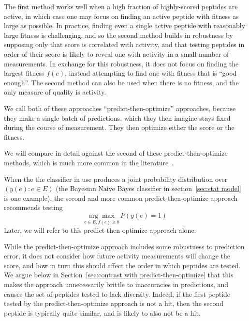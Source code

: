 The first method works well when a high fraction of highly-scored peptides are active, in which case one may focus on finding an active peptide with fitness as large as possible. In practice, finding even a single active peptide with reasonably large fitness is challenging, and so the second method 
builds in robustness by supposing only that score is correlated with activity, and that testing peptides in order of their score is likely to reveal one with activity in a small number of measurements.
In exchange for this robustness, it does not focus on finding the largest fitness $f(e)$, instead attempting to find one with fitness that is ``good enough''.
The second method can also be used when there is no fitness, and the only measure of quality is activity.

We call both of these approaches ``predict-then-optimize'' approaches, because they make a single batch of predictions, which they then imagine stays fixed during the course of measurement.
They then optimize either the score or the fitness.

We will compare in detail against the second of these predict-then-optimize methods, which is much more common in the literature~\cite{agarwal2010ranking, ballester2010machine, smith2010sirt3}.   

When the  the classifier in use produces a joint probability distribution over $\left(y(e): e \in E\right)$ (the Bayesian Naive Bayes classifier in section~\ref{sec:stat model} is one example), the second and more common predict-then-optimize approach 
recommends testing
\begin{equation*}
  \underset{e \in E, f(e) \ge b}{\arg\max} \, P(y(e)=1)
  \label{}
\end{equation*}
Later, we will refer to this predict-then-optimize approach alone.

While the predict-then-optimize approach includes some robustness to prediction error, it does not consider how future activity measurements will change the score, and how in turn this should affect the order in which peptides are tested.  We argue below  in Section~\ref{sec:contrast with predict-then-optimize} that this makes the approach unnecessarily brittle to inaccuracies in predictions, and causes the set of peptides tested to lack diversity.  
Indeed, if the first peptide tested by the predict-then-optimize approach is not a hit, then the second peptide is typically quite similar, and is likely to also not be a hit.

